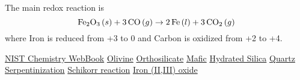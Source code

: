 \documentclass[a4paper,14pt]{extarticle}
\def\O{{\rm O}}
\def\C{{\rm C}}
\def\Fe{{\rm Fe}}
\begin{document}
The main redox reaction is
\[
    \Fe_2\O_3\,(s) + 3\,\C\O\,(g) \rightarrow 2\,\Fe\,(l) + 3\,\C\O_2\,(g)
\]
where Iron is reduced from +3 to 0 and Carbon is oxidized from +2 to +4.

\begin{thebibliography}{9}
                  \href{https://webbook.nist.gov/}{NIST Chemistry WebBook}
               \href{https://en.wikipedia.org/wiki/Olivine}{Olivine}
         \href{https://en.wikipedia.org/wiki/Orthosilicate}{Orthosilicate}
                 \href{https://en.wikipedia.org/wiki/Mafic}{Mafic}
       \href{https://en.wikipedia.org/wiki/Hydrated_silica}{Hydrated Silica}
                \href{https://en.wikipedia.org/wiki/Quartz}{Quartz}
      \href{https://en.wikipedia.org/wiki/Serpentinization}{Serpentinization}
     \href{https://en.wikipedia.org/wiki/Schikorr_reaction}{Schikorr reaction}
     \href{https://en.wikipedia.org/wiki/Iron(II,III)_oxide}{Iron (II,III) oxide}
\end{thebibliography}
\end{document}
